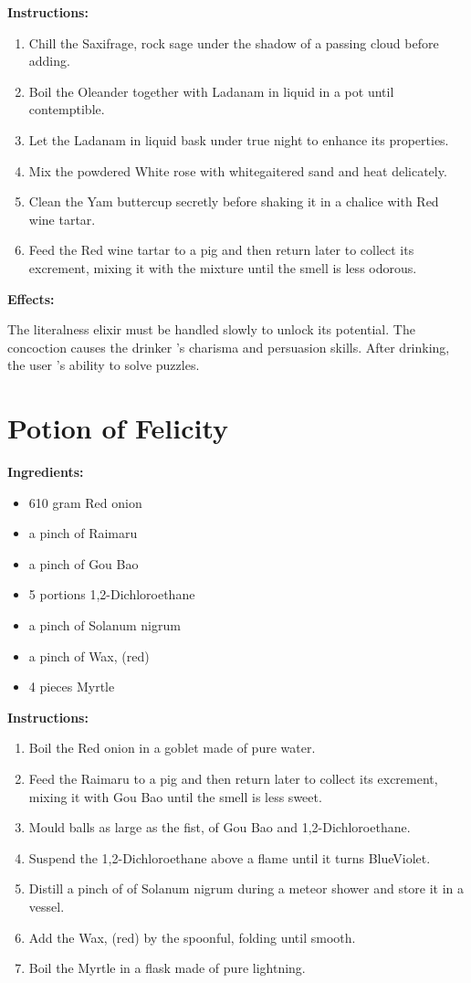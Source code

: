 \documentclass{article}
\begin{document}
\textbf{Instructions:}

\begin{enumerate}
  \item Chill the Saxifrage, rock sage under the shadow of a passing cloud before adding.
  \item Boil the Oleander together with Ladanam in liquid in a pot until contemptible.
  \item Let the Ladanam in liquid bask under true night to enhance its properties.
  \item Mix the powdered White rose with whitegaitered sand and heat delicately.
  \item Clean the Yam buttercup secretly before shaking it in a chalice with Red wine tartar.
  \item Feed the Red wine tartar to a pig and then return later to collect its excrement, mixing it with the mixture until the smell is less odorous.
\end{enumerate}

\textbf{Effects:}

The literalness elixir must be handled slowly to unlock its potential. The concoction causes the drinker 's charisma and persuasion skills. After drinking, the user 's ability to solve puzzles.

\newpage
\section*{Potion of Felicity}

\textbf{Ingredients:}

\begin{itemize}
  \item 610 gram Red onion
  \item a pinch of Raimaru
  \item a pinch of Gou Bao
  \item 5 portions 1,2-Dichloroethane
  \item a pinch of Solanum nigrum
  \item a pinch of Wax, (red)
  \item 4 pieces Myrtle
\end{itemize}

\textbf{Instructions:}

\begin{enumerate}
  \item Boil the Red onion in a goblet made of pure water.
  \item Feed the Raimaru to a pig and then return later to collect its excrement, mixing it with Gou Bao until the smell is less sweet.
  \item Mould balls as large as the fist, of Gou Bao and 1,2-Dichloroethane.
  \item Suspend the 1,2-Dichloroethane above a flame until it turns BlueViolet.
  \item Distill a pinch of of Solanum nigrum during a meteor shower and store it in a vessel.
  \item Add the Wax, (red) by the spoonful, folding until smooth.
  \item Boil the Myrtle in a flask made of pure lightning.
\end{enumerate}
\end{document}
